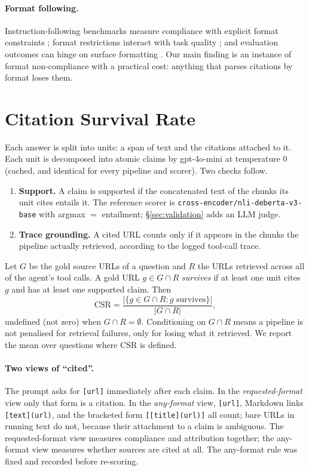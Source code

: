 \documentclass[11pt]{article}
\newcommand{\code}[1]{\texttt{#1}}
\begin{document}
\paragraph{Format following.} Instruction-following benchmarks measure compliance with explicit
format constraints \citep{zhou2023ifeval}; format restrictions interact with task quality
\citep{tam2024speakfreely}; and evaluation outcomes can hinge on surface formatting
\citep{sclar2024quantifying}. Our main finding is an instance of format non-compliance with a
practical cost: anything that parses citations by format loses them.

\section{Citation Survival Rate}
\label{sec:csr}

Each answer is split into units: a span of text and the citations attached to it. Each unit is
decomposed into atomic claims \citep{min2023factscore} by gpt-4o-mini at temperature 0 (cached, and
identical for every pipeline and scorer). Two checks follow.

\begin{enumerate}
\item \textbf{Support.} A claim is supported if the concatenated text of the chunks its unit cites
entails it. The reference scorer is \code{cross-encoder/nli-deberta-v3-base}
\citep{he2023debertav3} with argmax $=$ entailment; \S\ref{sec:validation} adds an LLM judge.
\item \textbf{Trace grounding.} A cited URL counts only if it appears in the chunks the pipeline
actually retrieved, according to the logged tool-call trace.
\end{enumerate}

Let $G$ be the gold source URLs of a question and $R$ the URLs retrieved across all of the agent's
tool calls. A gold URL $g \in G \cap R$ \emph{survives} if at least one unit cites $g$ and has at
least one supported claim. Then
\[
\mathrm{CSR} = \frac{|\{g \in G \cap R : g \text{ survives}\}|}{|G \cap R|},
\]
undefined (not zero) when $G \cap R = \emptyset$. Conditioning on $G \cap R$ means a pipeline is not
penalised for retrieval failures, only for losing what it retrieved. We report the mean over
questions where CSR is defined.

\paragraph{Two views of ``cited''.} The prompt asks for \code{[url]} immediately after each claim.
In the \emph{requested-format} view only that form is a citation. In the \emph{any-format} view,
\code{[url]}, Markdown links \code{[text](url)}, and the bracketed form \code{[[title](url)]} all
count; bare URLs in running text do not, because their attachment to a claim is ambiguous. The
requested-format view measures compliance and attribution together; the any-format view measures
whether sources are cited at all. The any-format rule was fixed and recorded before re-scoring.
\end{document}
